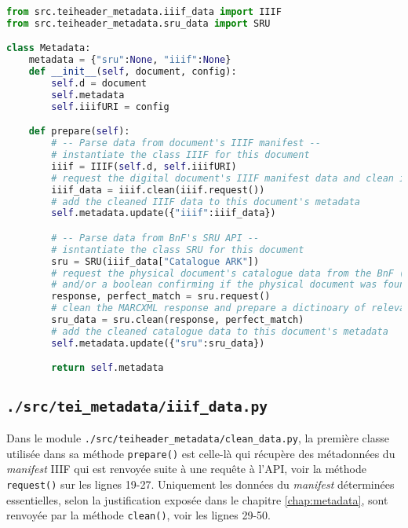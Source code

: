 \documentclass[class=article, crop=false]{standalone}
\begin{document}
\begin{lstlisting}[language=python, style=python]
from src.teiheader_metadata.iiif_data import IIIF
from src.teiheader_metadata.sru_data import SRU

class Metadata:
    metadata = {"sru":None, "iiif":None}
    def __init__(self, document, config):
        self.d = document
        self.metadata
        self.iiifURI = config

    def prepare(self):
        # -- Parse data from document's IIIF manifest --
        # instantiate the class IIIF for this document
        iiif = IIIF(self.d, self.iiifURI)
        # request the digital document's IIIF manifest data and clean it with methods from IIIF class
        iiif_data = iiif.clean(iiif.request())
        # add the cleaned IIIF data to this document's metadata
        self.metadata.update({"iiif":iiif_data})

        # -- Parse data from BnF's SRU API --
        # isntantiate the class SRU for this document
        sru = SRU(iiif_data["Catalogue ARK"])
        # request the physical document's catalogue data from the BnF (response) 
        # and/or a boolean confirming if the physical document was found (perfect_match)
        response, perfect_match = sru.request()
        # clean the MARCXML response and prepare a dictinoary of relevant metadata
        sru_data = sru.clean(response, perfect_match)
        # add the cleaned catalogue data to this document's metadata
        self.metadata.update({"sru":sru_data})

        return self.metadata
\end{lstlisting}

\subsection{\texttt{./src/tei\_metadata/iiif\_data.py}}
Dans le module \texttt{./src/teiheader\_metadata/clean\_data.py}, la première classe utilisée dans sa méthode \texttt{prepare()} est celle-là qui récupère des métadonnées du \textit{manifest} \acrshort{IIIF} qui est renvoyée suite à une requête à l'\acrshort{API}, voir la méthode \texttt{request()} sur les lignes 19-27. Uniquement les données du \textit{manifest} déterminées essentielles, selon la justification exposée dans le chapitre \ref{chap:metadata}, sont renvoyée par la méthode \texttt{clean()}, voir les lignes 29-50.
\end{document}
